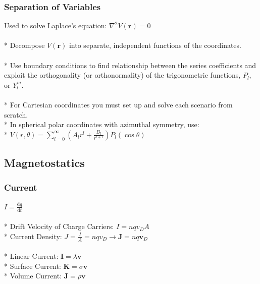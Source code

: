 \subsubsection{Separation of Variables}
Used to solve Laplace's equation: \(\nabla^2 V(\mathbf{r})=0\)\\\\*
Decompose \(V(\mathbf{r})\) into separate, independent functions of the coordinates.\\\\*
Use boundary conditions to find relationship between the series coefficients and exploit the orthogonality (or orthonormality) of the trigonometric functions, \(P_l\), or \(Y_l^m\).\\\\*
For Cartesian coordinates you must set up and solve each scenario from scratch.\\*
In spherical polar coordinates with azimuthal symmetry, use:\\*
\(\displaystyle V(r,\theta)=\sum_{l=0}^\infty\left(A_lr^l+\frac{B_l}{r^{l+1}}\right)P_l(\cos{\theta})\)

\subsection{Magnetostatics}

\subsubsection{Current}
\(\displaystyle I=\frac{\mathrm{d}q}{\mathrm{d}t}\)\\\\*
Drift Velocity of Charge Carriers: \(I=nqv_DA\)\\*
Current Density: \(J=\frac{I}{A}=nqv_D\to \mathbf{J}=nq\mathbf{v}_D\)\\\\*
Linear Current: \(\mathbf{I}=\lambda \mathbf{v}\)\\*
Surface Current: \(\mathbf{K}=\sigma \mathbf{v}\)\\*
Volume Current: \(\mathbf{J}=\rho \mathbf{v}\)

